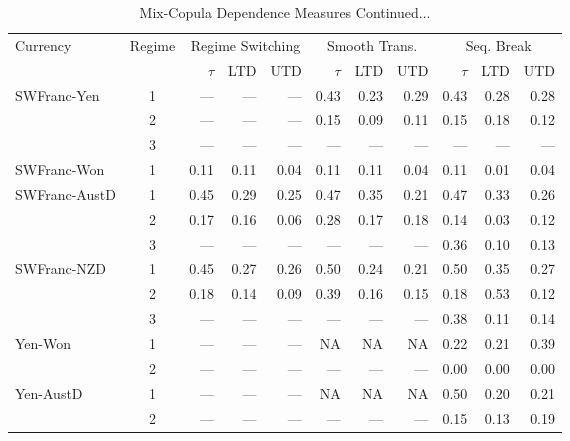 \documentclass[12pt]{article}
\begin{document}
\begin{table}
\caption{Mix-Copula Dependence Measures Continued...}
\begin{threeparttable}
	\begin{tabular}[c]{l c r r r | r r r | r r r}
\hline \hline
\noalign{\smallskip}
Currency & Regime & \multicolumn{3}{c}{Regime Switching} & \multicolumn{3}{c}{Smooth Trans.} & \multicolumn{3}{c}{Seq. Break} \\
\noalign{\smallskip}
\hline
\noalign{\smallskip}
 & & $\tau$ & LTD & UTD & $\tau$ & LTD & UTD & $\tau$ & LTD & UTD \\
 \hline
\noalign{\smallskip}
\noalign{\smallskip} \noalign{\smallskip}
SWFranc-Yen & 1 & ---  & ---  & ---  & 0.43  & 0.23  & 0.29  & 0.43  & 0.28  & 0.28  \\
		    & 2 & ---  & ---  & ---  & 0.15  & 0.09  & 0.11  & 0.15  & 0.18  & 0.12  \\
		    & 3 & ---  & ---  & ---  & ---  & ---  & ---  & ---  & ---  & ---  \\
\noalign{\smallskip} \noalign{\smallskip}
SWFranc-Won & 1 & 0.11  & 0.11  & 0.04  & 0.11  & 0.11  & 0.04  & 0.11  & 0.01  & 0.04  \\
\noalign{\smallskip} \noalign{\smallskip}
SWFranc-AustD & 1 & 0.45  & 0.29  & 0.25  & 0.47  & 0.35  & 0.21  & 0.47  & 0.33  & 0.26  \\
			  & 2 & 0.17  & 0.16  & 0.06  & 0.28  & 0.17  & 0.18  & 0.14  & 0.03  & 0.12  \\
			  & 3 & ---  & ---  & ---  & ---  & ---  & ---  & 0.36  & 0.10  & 0.13  \\
\noalign{\smallskip} \noalign{\smallskip}
SWFranc-NZD & 1 & 0.45  & 0.27  & 0.26  & 0.50  & 0.24  & 0.21  & 0.50  & 0.35  & 0.27  \\
		    & 2 & 0.18  & 0.14  & 0.09  & 0.39  & 0.16  & 0.15  & 0.18  & 0.53  & 0.12  \\
		    & 3 & ---  & ---  & ---  & ---  & ---  & ---  & 0.38  & 0.11  & 0.14  \\
\noalign{\smallskip}
\hline
\noalign{\smallskip} \noalign{\smallskip}
Yen-Won & 1 & ---  & ---  & ---  & NA  & NA  & NA  & 0.22  & 0.21  & 0.39  \\
		& 2 & ---  & ---  & ---  & ---  & ---  & ---  & 0.00  & 0.00  & 0.00  \\
\noalign{\smallskip} \noalign{\smallskip}
Yen-AustD & 1 & ---  & ---  & ---  & NA  & NA  & NA  & 0.50  & 0.20  & 0.21  \\
		  & 2 & ---  & ---  & ---  & ---  & ---  & ---  & 0.15  & 0.13  & 0.19  \\

\end{tabular}
\end{threeparttable}
\end{table}
\end{document}
